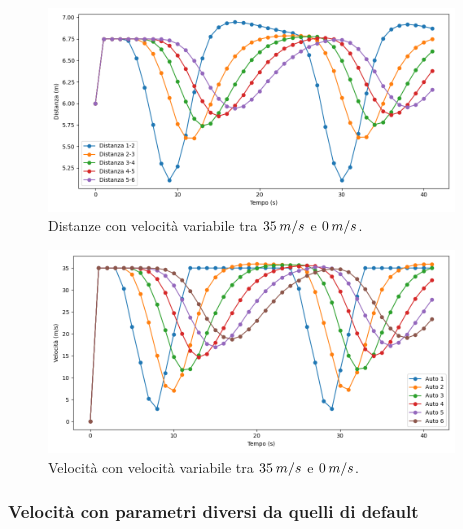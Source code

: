 \begin{figure}[H]
    \includegraphics[width=0.96\textwidth]{images/5-experiment/velocity/distance_35-35-0-35-35.png}
    \caption{Distanze con velocità variabile tra $35\hspace{0.2em}m/s$ e $0\hspace{0.2em}m/s$.}
    \label{fig:35-35-0-variabvelocity-distance}
\end{figure}

\begin{figure}[H]
    \includegraphics[width=0.96\textwidth]{images/5-experiment/velocity/velocity_35-35-0-35-35.png}
    \caption{Velocità con velocità variabile tra $35\hspace{0.2em}m/s$ e $0\hspace{0.2em}m/s$.}
    \label{fig:35-35-0-variabvelocity-velocity}
\end{figure}

\newpage



\subsubsection{Velocità con parametri diversi da quelli di default}

